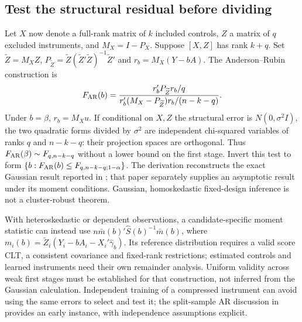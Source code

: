 \subsection{Test the structural residual before dividing}
Let $X$ now denote a full-rank matrix of $k$ included controls, $Z$ a
matrix of $q$ excluded instruments, and $M_X=I-P_X$. Suppose
$[X,Z]$ has rank $k+q$. Set $\widetilde Z=M_XZ$,
$P_{\widetilde Z}=\widetilde Z(\widetilde Z'\widetilde Z)^{-1}
\widetilde Z'$ and $r_b=M_X(Y-bA)$. The Anderson--Rubin construction is
\begin{equation}
 F_{\rm AR}(b)=
 \frac{r_b'P_{\widetilde Z}r_b/q}
      {r_b'(M_X-P_{\widetilde Z})r_b/(n-k-q)}.
 \label{r3:ar-statistic}
\end{equation}
Under $b=\beta$, $r_b=M_Xu$. If conditional on $X,Z$ the structural
error is $N(0,\sigma^2I)$, the two quadratic forms divided by
$\sigma^2$ are independent chi-squared variables of ranks $q$ and
$n-k-q$: their projection spaces are orthogonal. Thus
$F_{\rm AR}(\beta)\sim F_{q,n-k-q}$ without a lower bound on the
first stage. Invert this test to form
$\{b:F_{\rm AR}(b)\le F_{q,n-k-q;1-\alpha}\}$.
The derivation reconstructs the exact Gaussian result reported in
\citet[Section 2D, equation (2.24) and Theorem 3]{staiger1994}; that
paper separately supplies an asymptotic result under its moment
conditions. Gaussian, homoskedastic fixed-design inference is not a
cluster-robust theorem.

With heteroskedastic or dependent observations, a candidate-specific
moment statistic can instead use
$n\bar m(b)'\widehat S(b)^{-1}\bar m(b)$, where
$m_i(b)=\widetilde Z_i(Y_i-bA_i-X_i'\widehat\gamma_b)$.
Its reference distribution requires a valid score CLT, a consistent
covariance and fixed-rank restrictions; estimated controls and learned
instruments need their own remainder analysis. Uniform validity across
weak first stages must be established for that construction, not inferred
from the Gaussian calculation. Independent training of a compressed
instrument can avoid using the same errors to select and test it;
the split-sample AR discussion in \citet[printed p.17]{staiger1994}
provides an early instance, with independence assumptions explicit.

